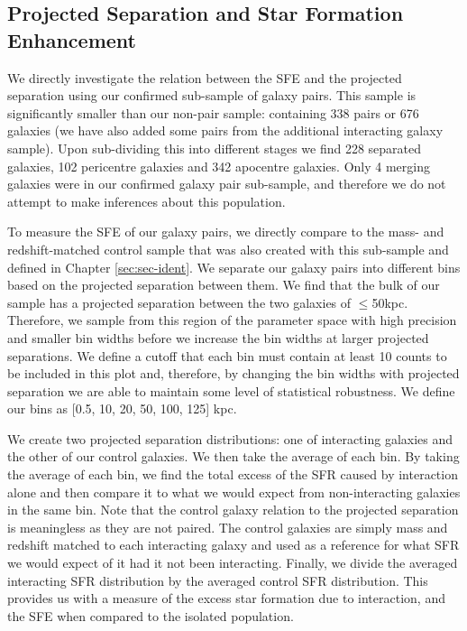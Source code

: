 \subsection{Projected Separation and Star Formation Enhancement}
\noindent We directly investigate the relation between the SFE and the projected separation using our confirmed sub-sample of galaxy pairs. This sample is significantly smaller than our non-pair sample: containing 338 pairs or 676 galaxies (we have also added some pairs from the additional interacting galaxy sample). Upon sub-dividing this into different stages we find 228 separated galaxies, 102 pericentre galaxies and 342 apocentre galaxies. Only 4 merging galaxies were in our confirmed galaxy pair sub-sample, and therefore we do not attempt to make inferences about this population. 

To measure the SFE of our galaxy pairs, we directly compare to the mass- and redshift-matched control sample that was also created with this sub-sample and defined in Chapter \ref{sec:sec-ident}. We separate our galaxy pairs into different bins based on the projected separation between them. We find that the bulk of our sample has a projected separation between the two galaxies of $\leq$50kpc. Therefore, we sample from this region of the parameter space with high precision and smaller bin widths before we increase the bin widths at larger projected separations. We define a cutoff that each bin must contain at least 10 counts to be included in this plot and, therefore, by changing the bin widths with projected separation we are able to maintain some level of statistical robustness. We define our bins as [0.5, 10, 20, 50, 100, 125] kpc.

We create two projected separation distributions: one of interacting galaxies and the other of our control galaxies. We then take the average of each bin. By taking the average of each bin, we find the total excess of the SFR caused by interaction alone and then compare it to what we would expect from non-interacting galaxies in the same bin. Note that the control galaxy relation to the projected separation is meaningless as they are not paired. The control galaxies are simply mass and redshift matched to each interacting galaxy and used as a reference for what SFR we would expect of it had it not been interacting. Finally, we divide the averaged interacting SFR distribution by the averaged control SFR distribution. This provides us with a measure of the excess star formation due to interaction, and the SFE when compared to the isolated population.

